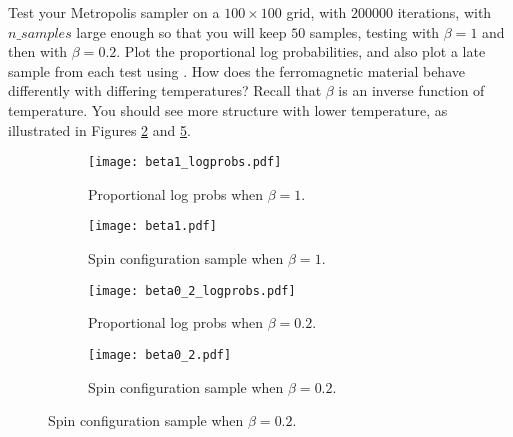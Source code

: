 \begin{problem}
Test your Metropolis sampler on a $100 \times 100$ grid, with $200000$ iterations, with $n\_samples$ large enough so that you will keep $50$ samples, testing with $\beta = 1$ and then with $\beta = 0.2$. Plot the proportional log probabilities, and also plot a late sample from each test using . How does the ferromagnetic material behave differently with differing temperatures? Recall that $\beta$ is an inverse function of temperature. You should see more structure with lower temperature, as illustrated in Figures \ref{fig:config1} and \ref{fig:config2}.
\end{problem}

\begin{figure}
	\begin{subfigure}[b]{.49\textwidth}
		\centering
		\texttt{[image: beta1\_logprobs.pdf]}
		\caption{Proportional log probs when $\beta = 1$.}
		\label{fig:lprobs1}
	\end{subfigure}
	\begin{subfigure}[b]{.49\textwidth}
		\centering
		\texttt{[image: beta1.pdf]}
		\caption{Spin configuration sample when $\beta = 1$.}
		\label{fig:config1}
	\end{subfigure}
	\begin{subfigure}[b]{.49\textwidth}
		\centering
		\texttt{[image: beta0\_2\_logprobs.pdf]}
		\caption{Proportional log probs when $\beta = 0.2$.}
		\label{fig:lprobs2}
	\end{subfigure}
	\begin{subfigure}[b]{.49\textwidth}
		\centering
		\texttt{[image: beta0\_2.pdf]}
		\caption{Spin configuration sample when $\beta = 0.2$.}
		\label{fig:config2}
	\end{subfigure}
\end{figure}
